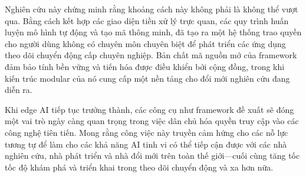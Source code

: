 Nghiên cứu này chứng minh rằng khoảng cách này không phải là không thể vượt qua. Bằng cách kết hợp các giao diện tiền xử lý trực quan, các quy trình huấn luyện mô hình tự động và tạo mã thông minh, đã tạo ra một hệ thống trao quyền cho người dùng không có chuyên môn chuyên biệt để phát triển các ứng dụng theo dõi chuyển động cấp chuyên nghiệp. Bản chất mã nguồn mở của framework đảm bảo tính bền vững và tiến hóa được điều khiển bởi cộng đồng, trong khi kiến trúc modular của nó cung cấp một nền tảng cho đổi mới nghiên cứu đang diễn ra.

Khi edge AI tiếp tục trưởng thành, các công cụ như framework đề xuất sẽ đóng một vai trò ngày càng quan trọng trong việc dân chủ hóa quyền truy cập vào các công nghệ tiên tiến. Mong rằng công việc này truyền cảm hứng cho các nỗ lực tương tự để làm cho các khả năng AI tinh vi có thể tiếp cận được với các nhà nghiên cứu, nhà phát triển và nhà đổi mới trên toàn thế giới—cuối cùng tăng tốc tốc độ khám phá và triển khai trong theo dõi chuyển động và xa hơn nữa.
